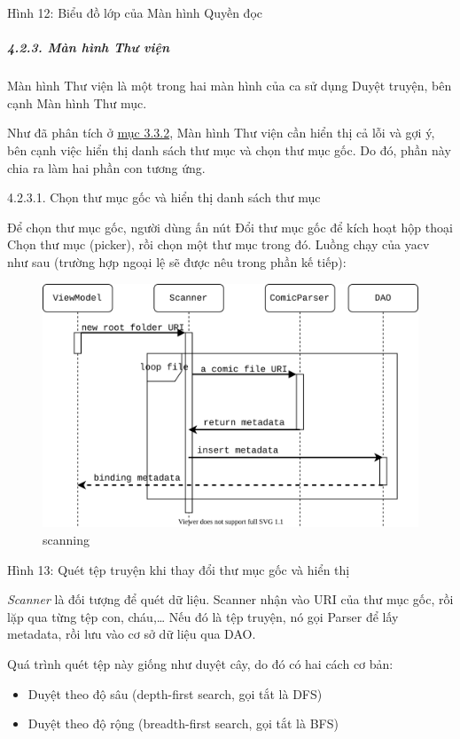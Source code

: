 \documentclass[
]{article}
\providecommand{\tightlist}{%
  \setlength{\itemsep}{0pt}\setlength{\parskip}{0pt}}
\begin{document}
Hình 12: Biểu đồ lớp của Màn hình Quyền đọc

\hypertarget{muxe0n-huxecnh-thux1b0-viux1ec7n}{%
\subparagraph{\texorpdfstring{4.2.3. Màn hình Thư viện
}{4.2.3. Màn hình Thư viện }}\label{muxe0n-huxecnh-thux1b0-viux1ec7n}}

Màn hình Thư viện là một trong hai màn hình của ca sử dụng Duyệt truyện,
bên cạnh Màn hình Thư mục.

Như đã phân tích ở \protect\hyperlink{P3.3.2-show-library}{mục 3.3.2},
Màn hình Thư viện cần hiển thị cả lỗi và gợi ý, bên cạnh việc hiển thị
danh sách thư mục và chọn thư mục gốc. Do đó, phần này chia ra làm hai
phần con tương ứng.

4.2.3.1. Chọn thư mục gốc và hiển thị danh sách thư mục

Để chọn thư mục gốc, người dùng ấn nút Đổi thư mục gốc để kích hoạt hộp
thoại Chọn thư mục (picker), rồi chọn một thư mục trong đó. Luồng chạy
của yacv như sau (trường hợp ngoại lệ sẽ được nêu trong phần kế tiếp):

\begin{figure}
\centering
\includegraphics{../images/scanning_sequence.svg}
\caption{scanning}
\end{figure}

Hình 13: Quét tệp truyện khi thay đổi thư mục gốc và hiển thị

\emph{Scanner} là đối tượng để quét dữ liệu. Scanner nhận vào URI của
thư mục gốc, rồi lặp qua từng tệp con, cháu,\ldots{} Nếu đó là tệp
truyện, nó gọi Parser để lấy metadata, rồi lưu vào cơ sở dữ liệu qua
DAO.

Quá trình quét tệp này giống như duyệt cây, do đó có hai cách cơ bản:

\begin{itemize}
\tightlist
\item
  Duyệt theo độ sâu (depth-first search, gọi tắt là DFS)
\item
  Duyệt theo độ rộng (breadth-first search, gọi tắt là BFS)
\end{itemize}
\end{document}
